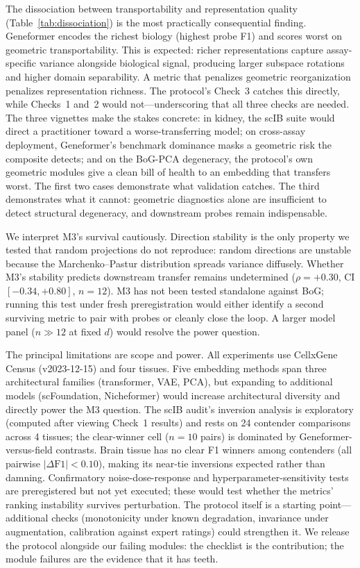 \documentclass[9pt,lineno]{elife}
\begin{document}
The dissociation between transportability and representation quality (Table~\ref{tab:dissociation}) is the most practically consequential finding. Geneformer encodes the richest biology (highest probe F1) and scores worst on geometric transportability. This is expected: richer representations capture assay-specific variance alongside biological signal, producing larger subspace rotations and higher domain separability. A metric that penalizes geometric reorganization penalizes representation richness. The protocol's Check~3 catches this directly, while Checks~1 and~2 would not---underscoring that all three checks are needed. The three vignettes make the stakes concrete: in kidney, the scIB suite would direct a practitioner toward a worse-transferring model; on cross-assay deployment, Geneformer's benchmark dominance masks a geometric risk the composite detects; and on the BoG-PCA degeneracy, the protocol's own geometric modules give a clean bill of health to an embedding that transfers worst. The first two cases demonstrate what validation catches. The third demonstrates what it cannot: geometric diagnostics alone are insufficient to detect structural degeneracy, and downstream probes remain indispensable.

We interpret M3's survival cautiously. Direction stability is the only property we tested that random projections do not reproduce: random directions are unstable because the Marchenko--Pastur distribution spreads variance diffusely. Whether M3's stability predicts downstream transfer remains undetermined ($\rho = +0.30$, CI $[-0.34, +0.80]$, $n = 12$). M3 has not been tested standalone against BoG; running this test under fresh preregistration would either identify a second surviving metric to pair with probes or cleanly close the loop. A larger model panel ($n \gg 12$ at fixed $d$) would resolve the power question.

The principal limitations are scope and power. All experiments use CellxGene Census (v2023-12-15) and four tissues. Five embedding methods span three architectural families (transformer, VAE, PCA), but expanding to additional models (scFoundation, Nicheformer) would increase architectural diversity and directly power the M3 question. The scIB audit's inversion analysis is exploratory (computed after viewing Check~1 results) and rests on 24 contender comparisons across 4 tissues; the clear-winner cell ($n = 10$ pairs) is dominated by Geneformer-versus-field contrasts. Brain tissue has no clear F1 winners among contenders (all pairwise $|\Delta\text{F1}| < 0.10$), making its near-tie inversions expected rather than damning. Confirmatory noise-dose-response and hyperparameter-sensitivity tests are preregistered but not yet executed; these would test whether the metrics' ranking instability survives perturbation. The protocol itself is a starting point---additional checks (monotonicity under known degradation, invariance under augmentation, calibration against expert ratings) could strengthen it. We release the protocol alongside our failing modules: the checklist is the contribution; the module failures are the evidence that it has teeth.
\end{document}
